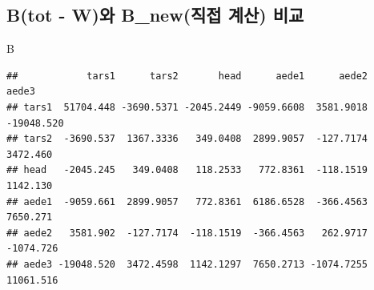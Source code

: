 \documentclass[
]{article}
\newenvironment{Shaded}{\begin{snugshade}}{\end{snugshade}}
\newcommand{\AttributeTok}[1]{\textcolor[rgb]{0.13,0.29,0.53}{#1}}
\newcommand{\ControlFlowTok}[1]{\textcolor[rgb]{0.13,0.29,0.53}{\textbf{#1}}}
\newcommand{\DecValTok}[1]{\textcolor[rgb]{0.00,0.00,0.81}{#1}}
\newcommand{\FunctionTok}[1]{\textcolor[rgb]{0.13,0.29,0.53}{\textbf{#1}}}
\newcommand{\NormalTok}[1]{#1}
\newcommand{\OtherTok}[1]{\textcolor[rgb]{0.56,0.35,0.01}{#1}}
\newcommand{\SpecialCharTok}[1]{\textcolor[rgb]{0.81,0.36,0.00}{\textbf{#1}}}
\begin{document}
\begin{Shaded}
\end{Shaded}

\subsection{B(tot - W)와 B\_new(직접 계산)
비교}\label{btot---wuxc640-b_newuxc9c1uxc811-uxacc4uxc0b0-uxbe44uxad50}

\begin{Shaded}
\begin{Highlighting}[]
\NormalTok{B}
\end{Highlighting}
\end{Shaded}

\begin{verbatim}
##            tars1      tars2       head      aede1      aede2      aede3
## tars1  51704.448 -3690.5371 -2045.2449 -9059.6608  3581.9018 -19048.520
## tars2  -3690.537  1367.3336   349.0408  2899.9057  -127.7174   3472.460
## head   -2045.245   349.0408   118.2533   772.8361  -118.1519   1142.130
## aede1  -9059.661  2899.9057   772.8361  6186.6528  -366.4563   7650.271
## aede2   3581.902  -127.7174  -118.1519  -366.4563   262.9717  -1074.726
## aede3 -19048.520  3472.4598  1142.1297  7650.2713 -1074.7255  11061.516
\end{verbatim}
\end{document}
